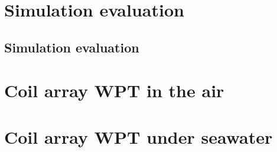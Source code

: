 \section{Simulation evaluation}
\subsection{Simulation evaluation}
\section{Coil array WPT in the air}

\section{Coil array WPT under seawater}